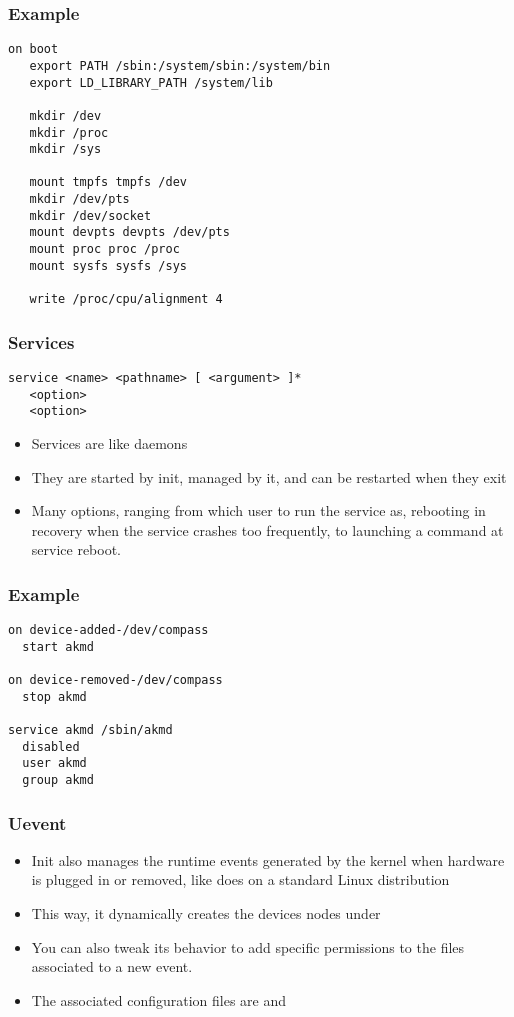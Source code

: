 \begin{frame}[fragile]
  \frametitle{Example}
\begin{verbatim}
on boot
   export PATH /sbin:/system/sbin:/system/bin
   export LD_LIBRARY_PATH /system/lib

   mkdir /dev
   mkdir /proc
   mkdir /sys

   mount tmpfs tmpfs /dev
   mkdir /dev/pts
   mkdir /dev/socket
   mount devpts devpts /dev/pts
   mount proc proc /proc
   mount sysfs sysfs /sys

   write /proc/cpu/alignment 4
\end{verbatim}
\end{frame}

\begin{frame}[fragile]
  \frametitle{Services}
\begin{verbatim}
service <name> <pathname> [ <argument> ]*
   <option>
   <option>
\end{verbatim}
  \begin{itemize}
  \item Services are like daemons
  \item They are started by init, managed by it, and can be restarted
    when they exit
  \item Many options, ranging from which user to run the service as,
    rebooting in recovery when the service crashes too frequently, to
    launching a command at service reboot.
  \end{itemize}
\end{frame}

\begin{frame}[fragile]
  \frametitle{Example}
\begin{verbatim}
on device-added-/dev/compass
  start akmd

on device-removed-/dev/compass
  stop akmd

service akmd /sbin/akmd
  disabled
  user akmd
  group akmd
\end{verbatim}
\end{frame}

\begin{frame}
  \frametitle{Uevent}
  \begin{itemize}
  \item Init also manages the runtime events generated by the kernel
    when hardware is plugged in or removed, like  does on a standard
    Linux distribution
  \item This way, it dynamically creates the devices nodes under 
  \item You can also tweak its behavior to add specific permissions to 
    the files associated to a new event.
  \item The associated configuration files are  and
  \end{itemize}
\end{frame}

